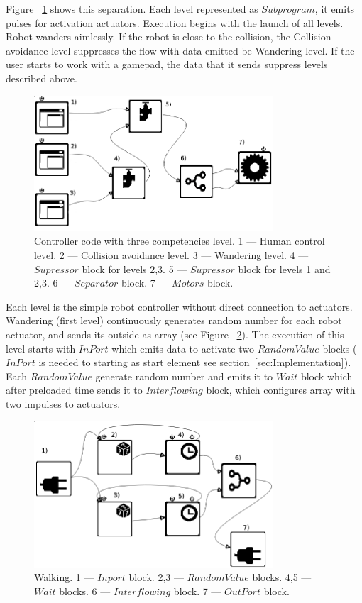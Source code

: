 \documentclass[conference,compsoc]{IEEEtran}
\begin{document}
Figure ~\ref{image:3layers} shows this separation. Each level represented as $Subprogram$, it emits pulses for activation actuators. Execution begins with the launch of all levels. Robot wanders aimlessly. If the robot is close to the collision, the Collision avoidance level suppresses the flow with data emitted be Wandering level. If the user starts to work with a gamepad, the data that it sends suppress levels described above.

\begin{figure}[ht]
	\centering
	\includegraphics[width=3.5in]{3layers.png}
	\caption{Controller code with three competencies level. 1 --- Human control level. 2 --- Collision avoidance level. 3 --- Wandering level. 4 --- $Supressor$ block for levels 2,3. 5 --- $Supressor$ block for levels 1 and  2,3. 6 --- $Separator$ block.  7 --- $Motors$ block.}
	\label{image:3layers}
\end{figure}

Each level is the simple robot controller without direct connection to actuators. Wandering (first level) continuously generates random number for each robot actuator, and sends its outside as array (see Figure ~\ref{image:1l}). The execution of this level starts with $InPort$ which emits data to activate two $RandomValue$ blocks ($InPort$ is needed to starting as start element see section~\ref{sec:Implementation}). Each $RandomValue$ generate random number and emits it to $Wait$ block which after preloaded time sends it to $Interflowing$ block, which configures array with two impulses to actuators.

\begin{figure}[ht]
	\centering
	\includegraphics[width=3.5in]{1l.png}
	\caption{Walking. 1 --- $Inport$ block.  2,3 --- $RandomValue$ blocks. 4,5 --- $Wait$ blocks. 6 --- $Interflowing$ block. 7 --- $OutPort$ block.}
	\label{image:1l}
\end{figure}
\end{document}
